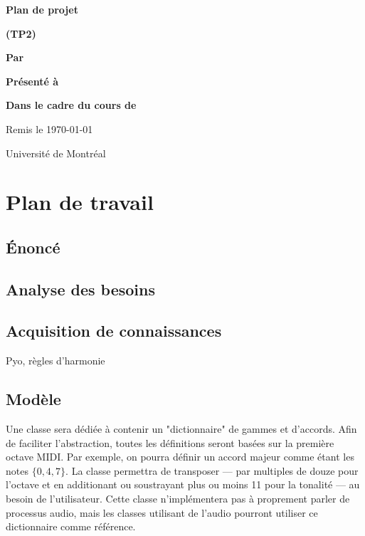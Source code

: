 \documentclass[letterpaper,12pt]{scrartcl}
\begin{document}
	\begin{center}
		\vspace{2cm}

		{\Huge\bf\sf Plan de projet}

		\vspace{0.5cm}

		{\bf\sf (TP2)}

		\vspace{4cm}

		{\bf\sf Par}

		\vspace{0.5cm}{\large\bf\sf François Poitras}

		\vspace{2cm}

		{\bf\sf Présenté à}

		\vspace{0.5cm}{\large\bf\sf Olivier Bélanger}

		\vspace{2cm}

		{\bf\sf Dans le cadre du cours de}

		\vspace{0.5cm}{\large\bf\sf Création Musicale en Language Python 2 (MUS2323)}

		\vspace{\fill}
		Remis le \today

		\vspace{0.5cm}Université de Montréal
	\end{center}

	\newpage
	
	\section{Plan de travail}
	\subsection{Énoncé}
	
	\subsection{Analyse des besoins}
	\subsection{Acquisition de connaissances}
	Pyo, règles d'harmonie
	\subsection{Modèle}
	Une classe sera dédiée à contenir un "dictionnaire" de gammes et d'accords. Afin de faciliter l'abstraction, toutes les définitions seront basées sur la première octave MIDI. Par exemple, on pourra définir un accord majeur comme étant les notes $\{0,4,7\}$. La classe permettra de transposer --- par multiples de douze pour l'octave et en additionant ou soustrayant plus ou moins 11 pour la tonalité --- au besoin de l'utilisateur. Cette classe n'implémentera pas à proprement parler de processus audio, mais les classes utilisant de l'audio pourront utiliser ce dictionnaire comme référence. 
	
\end{document}
